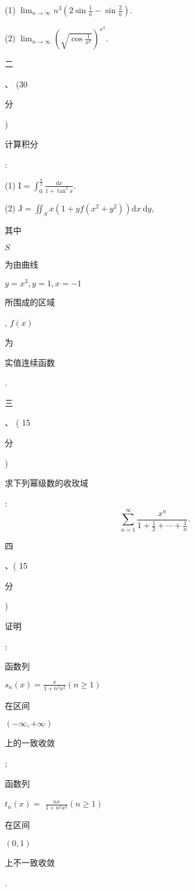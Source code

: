 \documentclass[10pt]{article}
\begin{document}
(1) $\lim _{n \rightarrow \infty} n^{3}\left(2 \sin \frac{1}{n}-\sin \frac{2}{n}\right)$.

(2) $\lim _{n \rightarrow \infty}\left(\sqrt{\cos \frac{1}{x^{2}}}\right)^{x^{4}}$.

\begin{CJK}{UTF8}{mj}二\end{CJK}、 (30 \begin{CJK}{UTF8}{mj}分\end{CJK}) \begin{CJK}{UTF8}{mj}计算积分\end{CJK}:

(1) $\mathrm{I}=\int_{0}^{\frac{\pi}{2}} \frac{\mathrm{d} x}{1+\tan ^{3} x}$.

(2) $\mathrm{J}=\iint_{S} x\left(1+y f\left(x^{2}+y^{2}\right)\right) \mathrm{d} x \mathrm{~d} y$, \begin{CJK}{UTF8}{mj}其中\end{CJK} $S$ \begin{CJK}{UTF8}{mj}为由曲线\end{CJK} $y=x^{3}, y=1, x=-1$ \begin{CJK}{UTF8}{mj}所围成的区域\end{CJK}, $f(x)$ \begin{CJK}{UTF8}{mj}为\end{CJK} \begin{CJK}{UTF8}{mj}实值连续函数\end{CJK}.

\begin{CJK}{UTF8}{mj}三\end{CJK}、 ( 15 \begin{CJK}{UTF8}{mj}分\end{CJK}) \begin{CJK}{UTF8}{mj}求下列幂级数的收玫域\end{CJK}:
$$
\sum_{n=1}^{\infty} \frac{x^{n}}{1+\frac{1}{2}+\cdots+\frac{1}{n}} .
$$
\begin{CJK}{UTF8}{mj}四\end{CJK}、( 15 \begin{CJK}{UTF8}{mj}分\end{CJK}) \begin{CJK}{UTF8}{mj}证明\end{CJK}: \begin{CJK}{UTF8}{mj}函数列\end{CJK} $s_{n}(x)=\frac{x}{1+n^{2} x^{2}}(n \geq 1)$ \begin{CJK}{UTF8}{mj}在区间\end{CJK} $(-\infty,+\infty)$ \begin{CJK}{UTF8}{mj}上的一致收敛\end{CJK}; \begin{CJK}{UTF8}{mj}函数列\end{CJK} $t_{n}(x)=$ $\frac{n x}{1+n^{2} x^{2}}(n \geq 1)$ \begin{CJK}{UTF8}{mj}在区间\end{CJK} $(0,1)$ \begin{CJK}{UTF8}{mj}上不一致收敛\end{CJK}.
\end{document}
